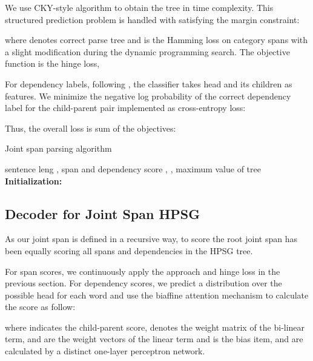 \documentclass[11pt,a4paper]{article}
\begin{document}
We use CKY-style algorithm \cite{SternP17,Gaddy} to obtain the tree  in  time complexity.
This structured prediction problem is handled with satisfying the margin constraint:

 where  denotes correct parse tree and  is the Hamming loss on category spans with a slight modification during the dynamic programming search. The objective function is the hinge loss,


For dependency labels, following \cite{Dozat2017Deep}, the classifier takes head and its children as features.
We minimize the negative log probability of the correct dependency label  for the child-parent pair  implemented as cross-entropy loss:

 Thus, the overall loss is sum of the objectives:



\begin{algorithm}[t!]
  \caption{Joint span parsing algorithm}
  \label{alg1}
  \begin{algorithmic}
  \REQUIRE sentence leng , span and dependency score , , 
  \ENSURE maximum value  of tree 
  \STATE \textbf{Initialization:} 
  \STATE  
        \STATE 
        \IF {}
            \STATE 
        \ELSE
            \STATE 
            
            
            \STATE  
            
            \STATE 
            
            \STATE 
        \ENDFOR
        \ENDIF
   \ENDFOR
   \ENDFOR
   \STATE 
  \end{algorithmic}
\end{algorithm}

\subsection{Decoder for Joint Span HPSG}

As our joint span is defined in a recursive way, to score the root joint span has been equally scoring all spans and dependencies in the HPSG tree.

For span scores, we continuously apply the approach and hinge loss  in the previous section. 
For dependency scores, we predict a distribution over the possible head for each word and use the biaffine attention mechanism \cite{Dozat2017Deep} to calculate the score as follow:

where  indicates the child-parent score,  denotes the weight matrix of the bi-linear term,  and  are the weight vectors of the linear term and  is the bias item,  and  are calculated by a distinct one-layer perceptron network.
\end{document}
